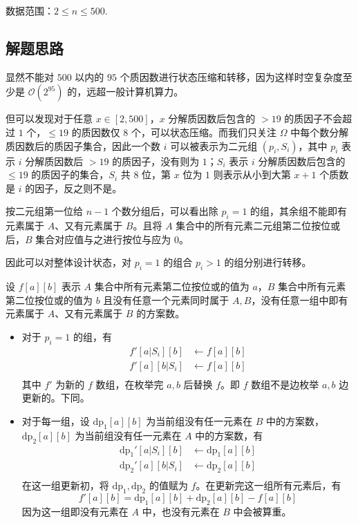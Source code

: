 数据范围：\(2\le n\le 500\).

\subsection{解题思路}

显然不能对 \(500\) 以内的 \(95\)
个质因数进行状态压缩和转移，因为这样时空复杂度至少是
\(\mathcal{O}(2^{95})\) 的，远超一般计算机算力。

但可以发现对于任意 \(x\in[2,500]\)，\(x\) 分解质因数后包含的 \(> 19\)
的质因子不会超过 \(1\) 个，\(\le19\) 的质因数仅 \(8\)
个，可以状态压缩。而我们只关注 \(\Omega\)
中每个数分解质因数后的质因子集合，因此一个数 \(i\) 可以被表示为二元组
\((p_i,S_i)\)，其中 \(p_i\) 表示 \(i\) 分解质因数后 \(> 19\)
的质因子，没有则为 \(1\)；\(S_i\) 表示 \(i\) 分解质因数后包含的
\(\le19\) 的质因子的集合，\(S_i\) 共 \(8\) 位，第 \(x\) 位为 \(1\)
则表示从小到大第 \(x+1\) 个质数是 \(i\) 的因子，反之则不是。

按二元组第一位给 \(n-1\) 个数分组后，可以看出除 \(p_i=1\)
的组，其余组不能即有元素属于 \(A\)、又有元素属于 \(B\)。且将 \(A\)
集合中的所有元素二元组第二位按位或后，\(B\) 集合对应值与之进行按位与应为
\(0\)。

因此可以对整体设计状态，对 \(p_i=1\) 的组合 \(p_i > 1\)
的组分别进行转移。

设 \(f[a][b]\) 表示 \(A\) 集合中所有元素第二位按位或的值为 \(a\)，\(B\)
集合中所有元素第二位按位或的值为 \(b\) 且没有任意一个元素同时属于
\(A,B\)，没有任意一组中即有元素属于 \(A\)、又有元素属于 \(B\) 的方案数。

\begin{itemize}
\item
  对于 \(p_i=1\) 的组，有 \[
  \begin{aligned}
  f'[a|S_i][b]&\leftarrow f[a][b]\\
  f'[a][b|S_i]&\leftarrow f[a][b]\\
  \end{aligned}
  \] 其中 \(f'\) 为新的 \(f\) 数组，在枚举完 \(a,b\) 后替换 \(f\)。即
  \(f\) 数组不是边枚举 \(a,b\) 边更新的。下同。
\item
  对于每一组，设 \(\operatorname{dp_1}[a][b]\) 为当前组没有任一元素在
  \(B\) 中的方案数， \(\operatorname{dp_2}[a][b]\)
  为当前组没有任一元素在 \(A\) 中的方案数，有 \[
  \begin{aligned}
  \operatorname{dp_1}'[a|S_i][b]&\leftarrow \operatorname{dp_1}[a][b]\\
  \operatorname{dp_2}'[a][b|S_i]&\leftarrow \operatorname{dp_2}[a][b]\\
  \end{aligned}
  \] 在这一组更新初，将 \(\operatorname{dp_1},\operatorname{dp_2}\)
  的值赋为 \(f\)。在更新完这一组所有元素后，有 \[
  f'[a][b]=\operatorname{dp_1}[a][b]+\operatorname{dp_2}[a][b]-f[a][b]
  \] 因为这一组即没有元素在 \(A\) 中，也没有元素在 \(B\) 中会被算重。
\end{itemize}


